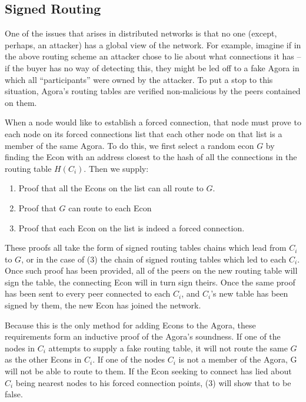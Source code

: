 \documentclass{article}
\begin{document}
\subsection{Signed Routing}

One of the issues that arises in distributed networks is that no one (except, perhaps, an attacker) has a global view of the network. For example, imagine if in the above routing scheme an attacker chose to lie about what connections it has – if the buyer has no way of detecting this, they might be led off to a fake Agora in which all “participants” were owned by the attacker. To put a stop to this situation, Agora's routing tables are verified non-malicious by the peers contained on them.

When a node would like to establish a forced connection, that node must prove to each node on its forced connections list that each other node on that list is a member of the same Agora. To do this, we first select a random econ $G$ by finding the Econ with an address closest to the hash of all the connections in the routing table $H(C_i)$. Then we supply:

\begin{enumerate}
    \item Proof that all the Econs on the list can all route to $G$.
    \item Proof that $G$ can route to each Econ
    \item Proof that each Econ on the list is indeed a forced connection.
\end{enumerate}

These proofs all take the form of signed routing tables chains which lead from $C_i$ to $G$, or in the case of (3) the chain of signed routing tables which led to each $C_i$. Once such proof has been provided, all of the peers on the new routing table will sign the table, the connecting Econ will in turn sign theirs. Once the same proof has been sent to every peer connected to each $C_i$, and $C_i$'s new table has been signed by them, the new Econ has joined the network.

Because this is the only method for adding Econs to the Agora, these requirements form an inductive proof of the Agora's soundness. If one of the nodes in $C_i$ attempts to supply a fake routing table, it will not route the same $G$ as the other Econs in $C_i$. If one of the nodes $C_i$ is not a member of the Agora, G will not be able to route to them. If the Econ seeking to connect has lied about $C_i$ being nearest nodes to his forced connection points, (3) will show that to be false.
\end{document}
